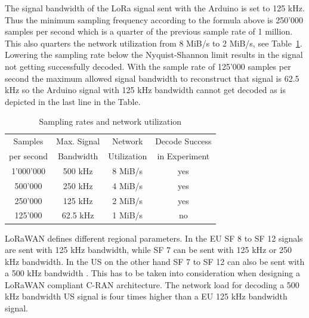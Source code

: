 The signal bandwidth of the LoRa signal sent with the Arduino is set to 125 kHz. Thus the minimum sampling frequency according to the formula above
is 250'000 samples per second which is a quarter of the previous sample rate of 1 million. This also quarters the network utilization from 8 MiB/s to 2 MiB/s, see Table~\ref{tabl:samprates}.
Lowering the sampling rate below the Nyquist-Shannon limit results in the signal not getting successfully decoded.
With the sample rate of 125'000 samples per second the maximum allowed signal bandwidth to reconstruct that signal is 62.5 kHz so the Arduino signal with 125 kHz bandwidth 
cannot get decoded as is depicted in the last line in the Table.

\begin{table}[h]
    \centering
    \setlength{\tabcolsep}{22pt}
    \renewcommand{\arraystretch}{1.2}
    \begin{tabular}{cccc}
        \toprule
        Samples & Max. Signal & Network & Decode Success \\
        per second & Bandwidth & Utilization & in Experiment\\
        \midrule
        1'000'000  &500 kHz & 8 MiB/s    &yes\\
        500'000  &250 kHz & 4 MiB/s    &yes\\
        250'000&  125 kHz&  2 MiB/s  & yes\\
        125'000 & 62.5 kHz & 1 MiB/s & no\\
        \bottomrule
       \end{tabular}
\caption{Sampling rates and network utilization}
\label{tabl:samprates}
\end{table}

LoRaWAN defines different regional parameters. In the EU SF 8 to SF 12 signals are sent with 125 kHz bandwidth, while SF 7
can be sent with 125 kHz or 250 kHz bandwidth. In the US on the other hand SF 7 to SF 12 can also be sent with
a 500 kHz bandwidth \cite{lora_wan_reg_params}.
This has to be taken into consideration when designing a LoRaWAN compliant C-RAN architecture.
The network load for decoding a 500 kHz bandwidth US signal is four times higher than a EU 125 kHz bandwidth signal.

